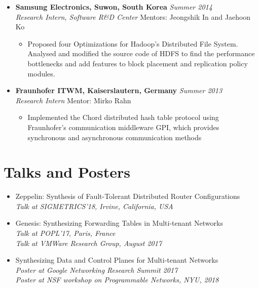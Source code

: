 \documentclass[11pt,a4paper,sans]{moderncv}        %
\begin{document}
\begin{itemize}
	\item \textbf{Samsung Electronics, Suwon, South Korea} \hfill \emph{Summer 2014} \\
	\emph{Research Intern, Software R\&D Center} \hfill Mentors: Jeongshik In and Jaehoon Ko
	\begin{itemize}
		\item Proposed four Optimizations for Hadoop's Distributed File System. Analysed and
		modified the source code of HDFS to find the performance bottlenecks and add features to
		block placement and replication policy modules.
	\end{itemize}
	\vspace*{6pt}
	\item \textbf{Fraunhofer ITWM, Kaiserslautern, Germany} \hfill \emph{Summer 2013} \\
	\emph{Research Intern} \hfill Mentor: Mirko Rahn
		\begin{itemize}
			\item Implemented the Chord distributed hash table protocol using Fraunhofer's communication middleware GPI, which provides
			synchronous and asynchronous communication methods
		\end{itemize}

\end{itemize}

\vspace{2pt}

\section{Talks and Posters}
\begin{itemize}
\item Zeppelin: Synthesis of Fault-Tolerant Distributed Router Configurations \\
\emph{Talk at SIGMETRICS'18, Irvine, California, USA}

\item Genesis: Synthesizing Forwarding Tables in Multi-tenant Networks \\
\emph{Talk at POPL'17, Paris, France} \\
\emph{Talk at VMWare Research Group, August 2017}

\item Synthesizing Data and Control Planes for Multi-tenant Networks \\
\emph{Poster at Google Networking Research Summit 2017} \\
\emph{Poster at NSF workshop on Programmable Networks, NYU, 2018}
\end{itemize}
\end{document}
